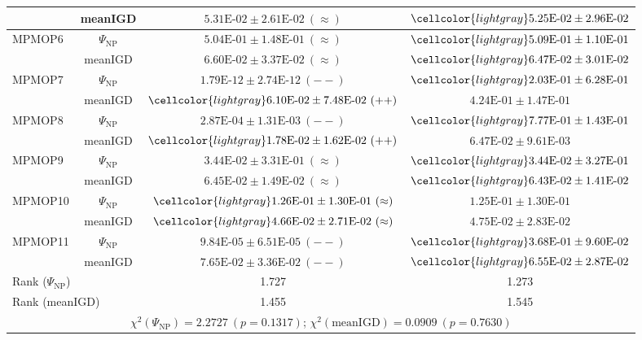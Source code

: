 \documentclass[journal]{IEEEtran}
\begin{document}
\begin{table}[htbp]
\begin{tabular}{@{}lccc@{}}
		& meanIGD & $5.31\text{E-}02 \pm 2.61\text{E-}02\ (\approx)$ & $\cellcolor{lightgray} 5.25\text{E-}02 \pm 2.96\text{E-}02$ \\
		\midrule
		\multirow{2}{*}{MPMOP6} 
		& $\Psi_{\mathrm{NP}}$ & $5.04\text{E-}01 \pm 1.48\text{E-}01\ (\approx)$ & $\cellcolor{lightgray} 5.09\text{E-}01 \pm 1.10\text{E-}01$ \\
		& meanIGD & $6.60\text{E-}02 \pm 3.37\text{E-}02\ (\approx)$ & $\cellcolor{lightgray} 6.47\text{E-}02 \pm 3.01\text{E-}02$ \\
		\midrule
		\multirow{2}{*}{MPMOP7} 
		& $\Psi_{\mathrm{NP}}$ & $1.79\text{E-}12 \pm 2.74\text{E-}12\ (--)$ & $\cellcolor{lightgray} 2.03\text{E-}01 \pm 6.28\text{E-}01$ \\
		& meanIGD & $\cellcolor{lightgray} 6.10\text{E-}02 \pm 7.48\text{E-}02\ (++)$ & $4.24\text{E-}01 \pm 1.47\text{E-}01$ \\
		\midrule
		\multirow{2}{*}{MPMOP8} 
		& $\Psi_{\mathrm{NP}}$ & $2.87\text{E-}04 \pm 1.31\text{E-}03\ (--)$ & $\cellcolor{lightgray} 7.77\text{E-}01 \pm 1.43\text{E-}01$ \\
		& meanIGD & $\cellcolor{lightgray} 1.78\text{E-}02 \pm 1.62\text{E-}02\ (++)$ & $6.47\text{E-}02 \pm 9.61\text{E-}03$ \\
		\midrule
		\multirow{2}{*}{MPMOP9} 
		& $\Psi_{\mathrm{NP}}$ & $3.44\text{E-}02 \pm 3.31\text{E-}01\ (\approx)$ & $\cellcolor{lightgray} 3.44\text{E-}02 \pm 3.27\text{E-}01$ \\
		& meanIGD & $6.45\text{E-}02 \pm 1.49\text{E-}02\ (\approx)$ & $\cellcolor{lightgray} 6.43\text{E-}02 \pm 1.41\text{E-}02$ \\
		\midrule
		\multirow{2}{*}{MPMOP10} 
		& $\Psi_{\mathrm{NP}}$ & $\cellcolor{lightgray} 1.26\text{E-}01 \pm 1.30\text{E-}01\ (\approx)$ & $1.25\text{E-}01 \pm 1.30\text{E-}01$ \\
		& meanIGD & $\cellcolor{lightgray} 4.66\text{E-}02 \pm 2.71\text{E-}02\ (\approx)$ & $4.75\text{E-}02 \pm 2.83\text{E-}02$ \\
		\midrule
		\multirow{2}{*}{MPMOP11} 
		& $\Psi_{\mathrm{NP}}$ & $9.84\text{E-}05 \pm 6.51\text{E-}05\ (--)$ & $\cellcolor{lightgray} 3.68\text{E-}01 \pm 9.60\text{E-}02$ \\
		& meanIGD & $7.65\text{E-}02 \pm 3.36\text{E-}02\ (--)$ & $\cellcolor{lightgray} 6.55\text{E-}02 \pm 2.87\text{E-}02$ \\
		\midrule
		\multicolumn{2}{l}{Rank ($\Psi_{\mathrm{NP}}$)} & 1.727 & 1.273 \\
		\multicolumn{2}{l}{Rank (meanIGD)} & 1.455 & 1.545 \\
		\multicolumn{4}{c}{$\chi^2 (\Psi_{\mathrm{NP}})=2.2727\ (p=0.1317)$; $\chi^2 (\text{meanIGD})=0.0909\ (p=0.7630)$} \\
		\bottomrule
	\end{tabular}
\end{table}
\end{document}
